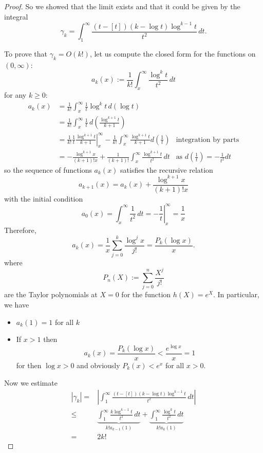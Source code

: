 \documentclass{article}
\newcommand{\Abs}[1]{\left| #1 \right|}
\begin{document}
\begin{proof}
So we showed that the limit exists and that it could be given by the integral
$$\gamma_k = \int_1^\infty \frac{(t - [t]) (k - \log t) \log^{k-1} t}{t^2} \, dt.$$

To prove that $\gamma_k = O(k!)$, let us compute the closed form for the functions on $(0, \infty)$:
$$a_k(x) := \frac{1}{k!} \int_x^\infty \frac{\log^k t}{t^2} \, dt$$
for any $k \geq 0$:
\begin{align*}
a_k(x) &= \frac{1}{k!} \int_x^\infty \frac{1}{t} \log^k t \, d(\log t)\\
&= \frac{1}{k!} \int_x^\infty \frac{1}{t} \, d \left( \frac{ \log^{k+1} t }{k+1} \right)\\
&= \frac{1}{k!} \left. \frac{1}{t} \frac{ \log^{k+1} t }{k+1} \right|_x^{\infty} - \frac{1}{k!} \int_x^\infty \frac{ \log^{k+1} t }{k+1} d \left( \frac{1}{t} \right) &\text{integration by parts}\\
&= -\frac{\log^{k+1} x}{(k+1)! x} + \frac{1}{(k+1)!} \int_x^\infty \frac{ \log^{k+1} t }{t^2} \, dt &\text{as } d \left( \frac{1}{t} \right) = -\frac{1}{t^2} dt
\end{align*}
so the sequence of functions $a_k(x)$ satisfies the recursive relation
$$a_{k+1}(x) = a_k(x) + \frac{ \log^{k+1} x }{(k+1)! x}$$
with the initial condition
$$a_0(x) = \int_x^\infty \frac{1}{t^2} \, dt = \left. -\frac{1}{t} \right|_x^{\infty} = \frac{1}{x}$$
Therefore,
$$a_k(x) = \frac{1}{x} \sum_{j = 0}^k \frac{\log^j x}{j!} = \frac{P_k(\log x)}{x}.$$
where
$$P_n(X) := \sum_{j = 0}^{n} \frac{X^j}{j!}$$
are the Taylor polynomials at $X = 0$ for the function $h(X) = e^X$. In particular, we have
\begin{itemize}
\item $a_k(1) = 1$ for all $k$
\item If $x > 1$ then
$$a_k(x) = \frac{P_k(\log x)}{x} < \frac{e^{\log x}}{x} = 1$$
for then $\log x > 0$ and obviously $P_k(x) < e^x$ for all $x > 0$.
\end{itemize}

Now we estimate
\begin{align*}
\Abs{\gamma_k} =& \Abs{ \int_1^\infty \frac{(t - [t]) (k - \log t) \log^{k-1} t}{t^2} \, dt }\\
\leq &\underbrace{\int_1^\infty \frac{k \log^{k-1} t}{t^2} \, dt}_{k! a_{k-1}(1)} + \underbrace{\int_1^\infty \frac{\log^k t}{t^2} \, dt}_{k! a_k(1)}\\
= & 2k!
\end{align*}


\end{proof}
\end{document}
